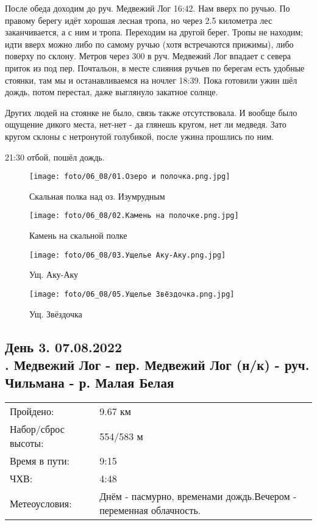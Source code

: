 После обеда доходим до руч. Медвежий Лог 16:42. Нам вверх по ручью. По правому берегу идёт хорошая лесная тропа,
но через 2.5 километра лес заканчивается, а с ним и тропа. Переходим на другой берег. Тропы не находим;
идти вверх можно либо по самому ручью (хотя встречаются прижимы), либо поверху по склону. Метров через
300 в руч. Медвежий Лог впадает с севера приток из под пер. Почтальон, в месте слияния ручьев по берегам
есть удобные стоянки, там мы и останавливаемся на ночлег 18:39.
Пока готовили ужин шёл дождь, потом перестал, даже выглянуло закатное солнце.

Других людей на стоянке не было, связь также отсутствовала. И вообще было ощущение дикого места,
нет-нет - да глянешь кругом, нет ли медведя. Зато кругом склоны с нетронутой голубикой, после ужина прошлись по ним.

21:30 отбой, пошёл дождь.

\begin{figure}
    \centering
    \texttt{[image: foto/06\_08/01.Озеро и полочка.png.jpg]}
    \caption{Скальная полка над оз. Изумрудным}
\end{figure}

\begin{figure}
    \centering
    \texttt{[image: foto/06\_08/02.Камень на полочке.png.jpg]}
    \caption{Камень на скальной полке}
\end{figure}

\begin{figure}
    \centering
    \texttt{[image: foto/06\_08/03.Ущелье Аку-Аку.png.jpg]}
    \caption{Ущ. Аку-Аку}
\end{figure}

\begin{figure}[H]
    \centering
    \texttt{[image: foto/06\_08/05.Ущелье Звёздочка.png.jpg]}
    \caption{Ущ. Звёздочка}
\end{figure}

\subsection{День 3. 07.08.2022\\
. Медвежий Лог - пер. Медвежий Лог (н/к) - руч. Чильмана - р. Малая Белая}
\begin{tabular}{l p{12cm}}
\hline
Пройдено: & 9.67 км\\
Набор/сброс высоты: & 554/583 м\\
Время в пути: & 9:15\\
ЧХВ: & 4:48\\
Метеоусловия: & Днём - пасмурно, временами дождь.\hfill \break Вечером - переменная облачность.\\
\hline
\end{tabular}

